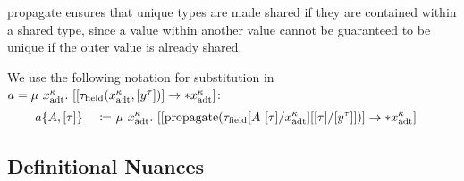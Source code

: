 propagate ensures that unique types are made shared if they are contained within a shared type, since a value within another value cannot be guaranteed to be unique if the outer value is already shared. 

We use the following notation for substitution in $a = \mu\ x^\kappa_\adt.\ [[\tau_\field(x^\kappa_\adt, [y^\tau])] \to *x^\kappa_\adt]$:
\begin{alignat*}{3}
	a\{A, [\tau]\}\ &&\coloneqq&\ \mu\ x^\kappa_\adt.\ [[\propagate(\tau_\field[A\ [\tau]/x^\kappa_\adt][[\tau]/[y^\tau]])] \to *x^\kappa_\adt]
\end{alignat*}

\subsection{Definitional Nuances}

